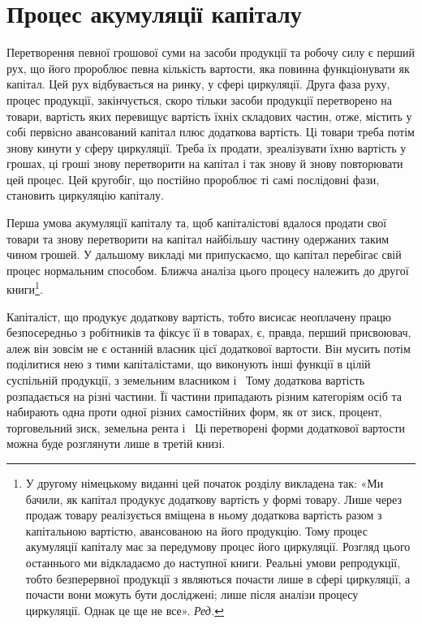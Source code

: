 
\chapter{Процес акумуляції капіталу}

\noindent{}Перетворення певної грошової суми на засоби продукції та
робочу силу є перший рух, що його пророблює певна кількість
вартости, яка повинна функціонувати як капітал. Цей рух відбувається
на ринку, у сфері циркуляції. Друга фаза руху, процес
продукції, закінчується, скоро тільки засоби продукції
перетворено на товари, вартість яких перевищує вартість їхніх
складових частин, отже, містить у собі первісно авансований
капітал плюс додаткова вартість. Ці товари треба потім знову
кинути у сферу циркуляції. Треба їх продати, зреалізувати їхню
вартість у грошах, ці гроші знову перетворити на капітал і
так знову й знову повторювати цей процес. Цей кругобіг, що
постійно пророблює ті самі послідовні фази, становить циркуляцію
капіталу.

\disablefootnotebreak{}
Перша умова акумуляції капіталу та, щоб капіталістові вдалося
продати свої товари та знову перетворити на капітал найбільшу
частину одержаних таким чином грошей. У дальшому
викладі ми припускаємо, що капітал перебігає свій процес нормальним
способом. Ближча аналіза цього процесу належить до
другої книги\footnote*{
У другому німецькому виданні цей початок розділу викладена
так: «Ми бачили, як капітал продукує додаткову вартість у формі товару.
Лише через продаж товару реалізується вміщена в ньому додаткова
вартість разом з капітальною вартістю, авансованою на його продукцію.
Тому процес акумуляції капіталу має за передумову процес його циркуляції.
Розгляд цього останнього ми відкладаємо до наступної книги.
Реальні умови репродукції, тобто безперервної продукції з являються
почасти лише в сфері циркуляції, а почасти вони можуть бути досліджені;
лише після аналізи процесу циркуляції. Однак це ще не все». \emph{Ред.}
}.
\enablefootnotebreak{}

Капіталіст, що продукує додаткову вартість, тобто висисає
неоплачену працю безпосередньо з робітників та фіксує її в товарах,
є, правда, перший присвоювач, алеж він зовсім не є
останній власник цієї додаткової вартости. Він мусить потім
поділитися нею з тими капіталістами, що виконують інші функції
в цілій суспільній продукції, з земельним власником і~
Тому додаткова вартість розпадається на різні частини. Її частини
припадають різним категоріям осіб та набирають одна проти
одної різних самостійних форм, як от зиск, процент, торговельний
зиск, земельна рента і~ Ці перетворені форми додаткової
вартости можна буде розглянути лише в третій книзі.
